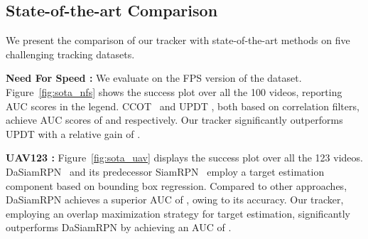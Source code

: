 \documentclass[10pt,twocolumn,letterpaper]{article}
\newcommand{\parsection}[1]{\noindent\textbf{#1:} }
\begin{document}
\subsection{State-of-the-art Comparison}
\label{sec:sota}We present the comparison of our tracker with state-of-the-art methods on five challenging tracking datasets.

\begin{table}[t]
	\centering
	\vspace{1mm}\caption{State-of-the-art comparison on the TrackingNet test set in terms of precision, normalized precision, and success. Our approach significantly outperforms UPDT, achieving a relative gain of  in terms of success.}\label{tab:trackingnet_sota}\vspace{-2mm}
\end{table}


\parsection{Need For Speed \cite{NfS}} We evaluate on the  FPS version of the dataset. Figure~\ref{fig:sota_nfs} shows the success plot over all the 100 videos, reporting AUC scores in the legend. CCOT~\cite{DanelljanECCV2016} and UPDT \cite{BhatECCV2018}, both based on correlation filters, achieve AUC scores of  and  respectively. Our tracker significantly outperforms UPDT with a relative gain of .

\parsection{UAV123 \cite{UAV123}} Figure~\ref{fig:sota_uav} displays the success plot over all the 123 videos. DaSiamRPN~\cite{DaSiamRPN} and its predecessor SiamRPN~\cite{SiamRPN} employ a target estimation component based on bounding box regression. Compared to other approaches, DaSiamRPN achieves a superior AUC of , owing to its accuracy. Our tracker, employing an overlap maximization strategy for target estimation, significantly outperforms DaSiamRPN by achieving an AUC of .
\end{document}
